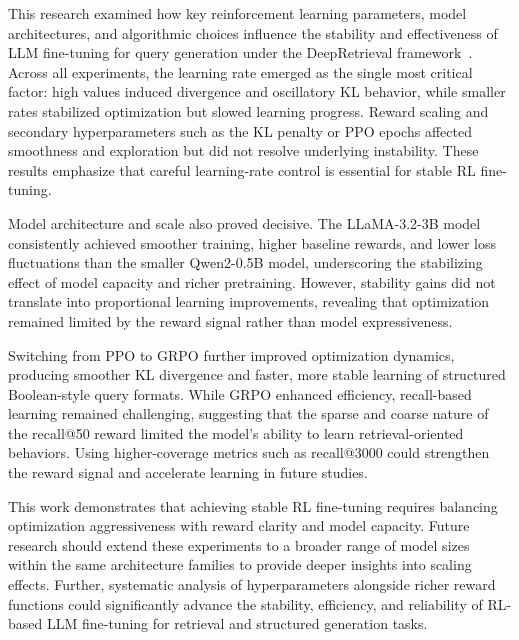 This research examined how key reinforcement learning parameters, model architectures, and algorithmic choices influence the stability and effectiveness of LLM fine-tuning for query generation under the DeepRetrieval framework~\cite{jiang2025deepretrieval}. Across all experiments, the learning rate emerged as the single most critical factor: high values induced divergence and oscillatory KL behavior, while smaller rates stabilized optimization but slowed learning progress. Reward scaling and secondary hyperparameters such as the KL penalty or PPO epochs affected smoothness and exploration but did not resolve underlying instability. These results emphasize that careful learning-rate control is essential for stable RL fine-tuning.

Model architecture and scale also proved decisive. The LLaMA-3.2-3B model consistently achieved smoother training, higher baseline rewards, and lower loss fluctuations than the smaller Qwen2-0.5B model, underscoring the stabilizing effect of model capacity and richer pretraining. However, stability gains did not translate into proportional learning improvements, revealing that optimization remained limited by the reward signal rather than model expressiveness.

Switching from PPO to GRPO further improved optimization dynamics, producing smoother KL divergence and faster, more stable learning of structured Boolean-style query formats. While GRPO enhanced efficiency, recall-based learning remained challenging, suggesting that the sparse and coarse nature of the recall@50 reward limited the model’s ability to learn retrieval-oriented behaviors. Using higher-coverage metrics such as recall@3000 could strengthen the reward signal and accelerate learning in future studies.

This work demonstrates that achieving stable RL fine-tuning requires balancing optimization aggressiveness with reward clarity and model capacity. Future research should extend these experiments to a broader range of model sizes within the same architecture families to provide deeper insights into scaling effects. Further, systematic analysis of hyperparameters alongside richer reward functions could significantly advance the stability, efficiency, and reliability of RL-based LLM fine-tuning for retrieval and structured generation tasks.